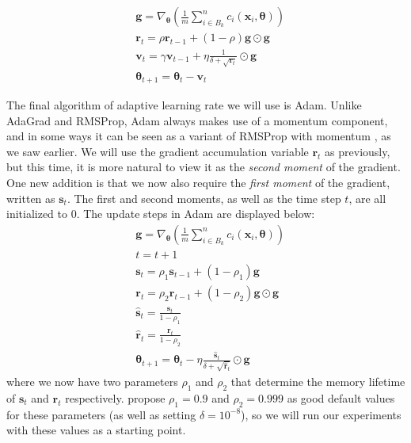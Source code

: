 \begin{align*}
    &\boldsymbol{g} = \nabla_{\boldsymbol{\theta}} \left ( \frac{1}{m} \sum_{i\in B_k}^n c_i (\boldsymbol{x}_i, \boldsymbol{\theta} ) \right )
    \\
    &\boldsymbol r_t = \rho \boldsymbol r_{t-1} + (1 -\rho)\boldsymbol{g} \odot \boldsymbol{g}
    \\
    &\boldsymbol v_t = \gamma \boldsymbol v_{t-1} + \eta \frac{1}{\delta + \sqrt{\boldsymbol r_t}} \odot \boldsymbol{g}
    \\
    &\boldsymbol{\theta}_{t+1} = \boldsymbol{\theta}_t - \boldsymbol v_t
\end{align*}

The final algorithm of adaptive learning rate we will use is Adam. Unlike AdaGrad and RMSProp, Adam always makes use of a momentum component, and in some ways it can be seen as a variant of RMSProp with momentum \cite{MHJweek39}, as we saw earlier. We will use the gradient accumulation variable $\boldsymbol r_t$ as previously, but this time, it is more natural to view it as the \emph{second moment} of the gradient. One new addition is that we now also require the \emph{first moment} of the gradient, written as $\boldsymbol s_t$. The first and second moments, as well as the time step $t$, are all initialized to 0. The update steps in Adam are displayed below:
\begin{align*}
    &\boldsymbol{g} = \nabla_{\boldsymbol{\theta}} \left ( \frac{1}{m} \sum_{i\in B_k}^n c_i (\boldsymbol{x}_i, \boldsymbol{\theta} ) \right )
    \\
    &t = t + 1
    \\
    &\boldsymbol s_t = \rho_1 \boldsymbol s_{t-1} + (1 -\rho_1)\boldsymbol{g}
    \\
    &\boldsymbol r_t = \rho_2 \boldsymbol r_{t-1} + (1 -\rho_2)\boldsymbol{g} \odot \boldsymbol{g}
    \\
    &\hat{\boldsymbol s}_t = \frac{\boldsymbol s_t}{1 - \rho_1}
    \\
    &\hat{\boldsymbol r}_t = \frac{\boldsymbol r_t}{1 - \rho_2}
    \\
    &\boldsymbol{\theta}_{t+1} = \boldsymbol{\theta}_t - \eta \frac{\hat{\boldsymbol s}_t}{\delta + \sqrt{\hat{\boldsymbol r}_t}} \odot \boldsymbol{g}
\end{align*}
where we now have two parameters $\rho_1$ and $\rho_2$ that determine the memory lifetime of $\boldsymbol s_t$ and $\boldsymbol r_t$ respectively. \textcite{Kingma2014AdamAM} propose $\rho_1 = 0.9$ and $\rho_2 = 0.999$ as good default values for these parameters (as well as setting $\delta = 10^{-8}$), so we will run our experiments with these values as a starting point. 

